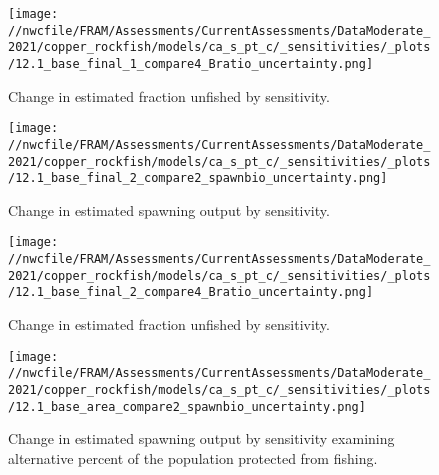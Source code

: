 \documentclass[11pt,
  english,
  a4paper,
]{article}
\begin{document}
\tagmcend\tagstructend


\begin{figure}
\centering
\texttt{[image: //nwcfile/FRAM/Assessments/CurrentAssessments/DataModerate\_2021/copper\_rockfish/models/ca\_s\_pt\_c/\_sensitivities/\_plots/12.1\_base\_final\_1\_compare4\_Bratio\_uncertainty.png]}
\caption{Change in estimated fraction unfished by sensitivity.\label{fig:sens-depl-1}}
\end{figure}

\tagmcend\tagstructend


\begin{figure}
\centering
\texttt{[image: //nwcfile/FRAM/Assessments/CurrentAssessments/DataModerate\_2021/copper\_rockfish/models/ca\_s\_pt\_c/\_sensitivities/\_plots/12.1\_base\_final\_2\_compare2\_spawnbio\_uncertainty.png]}
\caption{Change in estimated spawning output by sensitivity.\label{fig:sens-ssb-2}}
\end{figure}

\tagmcend\tagstructend


\begin{figure}
\centering
\texttt{[image: //nwcfile/FRAM/Assessments/CurrentAssessments/DataModerate\_2021/copper\_rockfish/models/ca\_s\_pt\_c/\_sensitivities/\_plots/12.1\_base\_final\_2\_compare4\_Bratio\_uncertainty.png]}
\caption{Change in estimated fraction unfished by sensitivity.\label{fig:sens-depl-2}}
\end{figure}

\tagmcend\tagstructend

\newpage


\begin{figure}
\centering
\texttt{[image: //nwcfile/FRAM/Assessments/CurrentAssessments/DataModerate\_2021/copper\_rockfish/models/ca\_s\_pt\_c/\_sensitivities/\_plots/12.1\_base\_area\_compare2\_spawnbio\_uncertainty.png]}
\caption{Change in estimated spawning output by sensitivity examining alternative percent of the population protected from fishing.\label{fig:sens-area-ssb}}
\end{figure}
\end{document}
